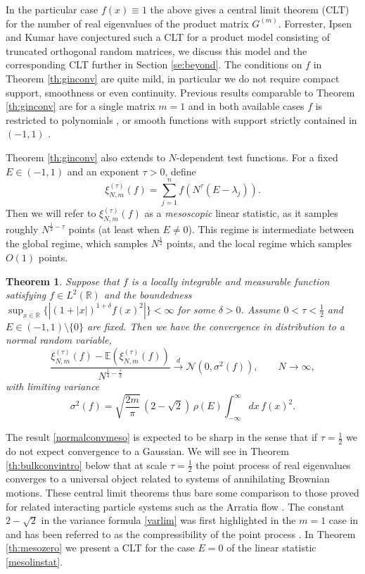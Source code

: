 \documentclass[11pt,reqno]{amsproc}
\newtheorem{theorem}{Theorem}
\numberwithin{equation}{section}
\numberwithin{theorem}{section}
\begin{document}
In the particular case $f(x) \equiv 1$ the above gives a central limit theorem (CLT) for the number of real eigenvalues of the product matrix $G^{(m)}$. Forrester, Ipsen and Kumar \cite{FIK20} have conjectured such a 
CLT for a product model consisting of truncated orthogonal random matrices, we discuss this model and the corresponding CLT further in Section \ref{se:beyond}. The conditions on $f$ in Theorem \ref{th:ginconv} are quite mild, in particular we do not require compact support, smoothness or even continuity. Previous results comparable to Theorem \ref{th:ginconv} are for a single matrix $m=1$ and in both available cases $f$ is restricted to polynomials \cite{S17-2}, or smooth functions with support strictly contained in $(-1,1)$ \cite{K15}. 

Theorem \ref{th:ginconv} also extends to $N$-dependent test functions. For a fixed $E \in (-1,1)$ and an exponent $\tau > 0$, define
\begin{equation}
\label{mesolinstat}
\xi^{(\tau)}_{N,m}(f) = \sum_{j=1}^{n}f(N^{\tau}(E-\lambda_j)). 
\end{equation}
Then we will refer to $\xi^{(\tau)}_{N,m}(f)$ as a \textit{mesoscopic} linear statistic, as it samples roughly $N^{\frac{1}{2}-\tau}$ points (at least when $E \neq 0$). This regime is intermediate between the global regime, which samples $N^{\frac{1}{2}}$ points, and the local regime which samples $O(1)$ points.
\begin{theorem}
\label{th:ginconvmeso}
Suppose that $f$ is a locally integrable and measurable function satisfying $f \in L^{2}(\mathbb{R})$ and the boundedness $\sup_{x\in \mathbb{R}}\{|(1+|x|)^{1+\delta}f(x)^{2}|\} < \infty$ for some $\delta>0$. Assume $0 < \tau < \frac{1}{2}$ and $E \in (-1,1)\setminus\{0\}$ are fixed. Then we have the convergence in distribution to a normal random variable,
\begin{equation}
\frac{\xi^{(\tau)}_{N,m}(f)-\mathbb{E}(\xi^{(\tau)}_{N,m}(f))}{N^{\frac{1}{4}-\frac{\tau}{2}}} \overset{d}{\longrightarrow} \mathcal{N}(0,\sigma^{2}(f)), \qquad N \to \infty, \label{normalconvmeso}
\end{equation}
with limiting variance
\begin{equation}
\sigma^{2}(f) = \sqrt{\frac{2m}{\pi}}\,(2-\sqrt{2})\,\rho(E)\int_{-\infty}^{\infty}dx\,f(x)^{2}. \label{varlimmeso}
\end{equation}
\end{theorem}
The result \eqref{normalconvmeso} is expected to be sharp in the sense that if $\tau = \frac{1}{2}$ we do not expect convergence to a Gaussian. We will see in Theorem \ref{th:bulkconvintro} below that at scale $\tau = \frac{1}{2}$ the point process of real eigenvalues converges to a universal object related to systems of annihilating Brownian motions. These central limit theorems thus bare some comparison to those proved for related interacting particle systems such as the Arratia flow \cite{GF18}. The constant $2-\sqrt{2}$ in the variance formula \eqref{varlim} was first highlighted in the $m=1$ case in \cite{FN07} and has been referred to as the compressibility of the point process \cite{F15}. In Theorem \ref{th:mesozero} we present a CLT for the case $E=0$ of the linear statistic \eqref{mesolinstat}.
\end{document}
